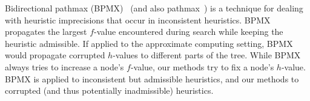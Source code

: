 \documentclass[letterpaper]{article}
\begin{document}
Bidirectional pathmax (BPMX)~\cite{FelnerZHSSZ11} (and also pathmax~\cite{mero1984aHeuristicSearch}) is a technique for dealing with heuristic imprecisions that occur in inconsistent heuristics. BPMX propagates the largest $f$-value encountered during search while keeping the heuristic admissible. If applied to the approximate computing setting, BPMX would propagate corrupted $h$-values to different parts of the tree. While BPMX always tries to increase a node's $f$-value, our methods try to fix a node's $h$-value. %
BPMX is applied to inconsistent but admissible heuristics,
and our methods to corrupted (and thus potentially inadmissible) heuristics.










\end{document}
